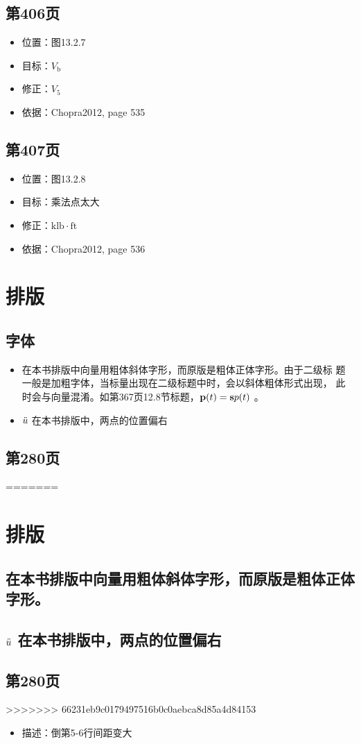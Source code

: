 \documentclass[11pt]{article}
\begin{document}
\subsection*{第406页}
\label{sec:org1320e56}

\begin{itemize}
\item 位置：图13.2.7
\item 目标：\(V_{\mathrm{b}}\)
\item 修正：\(V_{5}\)
\item 依据：Chopra2012, page 535
\end{itemize}

\subsection*{第407页}
\label{sec:org19fceae}

\begin{itemize}
\item 位置：图13.2.8
\item 目标：乘法点太大
\item 修正：\(\mathrm{klb{\cdot}ft}\)
\item 依据：Chopra2012, page 536
\end{itemize}

\section*{排版}
\label{sec:org2a26369}
\subsection*{字体}
\label{sec:orgaca534c}

\begin{itemize}
\item 在本书排版中向量用粗体斜体字形，而原版是粗体正体字形。由于二级标
题一般是加粗字体，当标量出现在二级标题中时，会以斜体粗体形式出现，
此时会与向量混淆。如第367页12.8节标题，\(\bm{\mathrm{p}}(t)=\bm{\mathrm{s}} p(t)\) 。
\item \(\ddot{u}\) 在本书排版中，两点的位置偏右
\end{itemize}

\subsection*{第280页}
\label{sec:org353be6c}
=======
\section*{排版}
\label{sec:orgfd52772}
\subsection*{在本书排版中向量用粗体斜体字形，而原版是粗体正体字形。}
\label{sec:org03a7f67}
\subsection*{\(\ddot{u}\) 在本书排版中，两点的位置偏右}
\label{sec:org09ad263}
\subsection*{第280页}
\label{sec:org964f391}
>>>>>>> 66231eb9c0179497516b0c0aebca8d85a4d84153

\begin{itemize}
\item 描述：倒第5-6行间距变大
\end{itemize}
\end{document}

